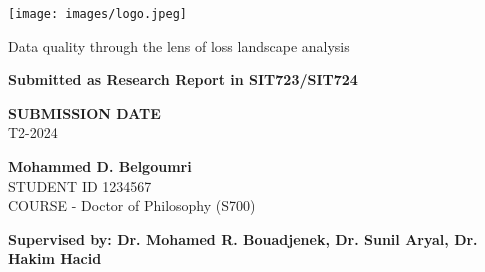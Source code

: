\begin{titlepage}
	\thispagestyle{empty}
	\texttt{[image: images/logo.jpeg]}
	\begin{center}
		\vspace*{4cm}
		{\LARGE Data quality through the lens of loss landscape analysis}
		\vspace{3cm}
		\begin{large}


			{\bf Submitted as Research Report in SIT723/SIT724}
			\vspace{1cm}

			{\bf SUBMISSION DATE} \\
			T2-2024

			\vspace{3cm}
			\textbf{Mohammed D. Belgoumri}\\
			STUDENT ID 1234567 \\
			COURSE - Doctor of Philosophy (S700)
			\vfill

			{\bf
				\normalsize Supervised by: Dr. Mohamed R. Bouadjenek, Dr. Sunil Aryal, Dr. Hakim Hacid
			}\\
		\end{large}
	\end{center}
\end{titlepage}